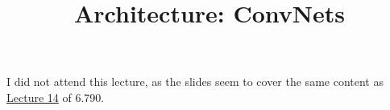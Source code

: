 \title{Architecture: ConvNets}



I did not attend this lecture,
as the slides seem to cover the same content as
\href{/6.790/lectures/14}{Lecture 14} of 6.790.

